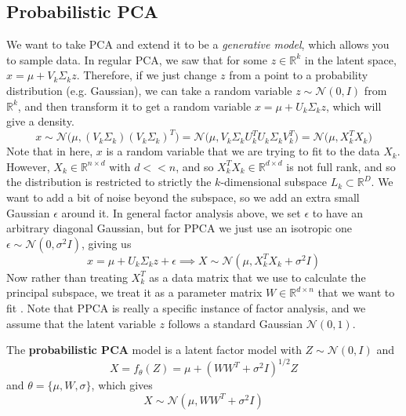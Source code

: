 \documentclass{article}
\begin{document}
\subsection{Probabilistic PCA}

  We want to take PCA and extend it to be a \textit{generative model}, which allows you to sample data. In regular PCA, we saw that for some $z \in \mathbb{R}^k$ in the latent space, $\hat{x} = \mu + V_k \Sigma_k z$. Therefore, if we just change $z$ from a point to a probability distribution (e.g. Gaussian), we can take a random variable $z \sim \mathcal{N}(0, I)$ from $\mathbb{R}^k$, and then transform it to get a random variable $x = \mu + U_k \Sigma_k z$, which will give a density. 
  \begin{equation}
    x \sim \mathcal{N} \big( \mu, (V_k \Sigma_k)(V_k \Sigma_k)^T \big) = \mathcal{N} \big( \mu, V_k \Sigma_k U_k^T U_k \Sigma_k V_k^T \big) = \mathcal{N} \big( \mu, X_k^T X_k)
  \end{equation} 
  Note that in here, $x$ is a random variable that we are trying to fit to the data $X_k$. However, $X_k \in \mathbb{R}^{n \times d}$ with $d << n$, and so $X_k^T X_k \in \mathbb{R}^{d \times d}$ is not full rank, and so the distribution is restricted to strictly the $k$-dimensional subspace $L_k \subset \mathbb{R}^D$. We want to add a bit of noise beyond the subspace, so we add an extra small Gaussian $\epsilon$ around it. In general factor analysis above, we set $\epsilon$ to have an arbitrary diagonal Gaussian, but for PPCA we just use an isotropic one $\epsilon \sim \mathcal{N}(0, \sigma^2 I)$, giving us  
  \begin{equation}
    x = \mu + U_k \Sigma_k z + \epsilon \implies X \sim \mathcal{N}(\mu, X_k^T X_k + \sigma^2 I)
  \end{equation} 
  Now rather than treating $X_k^T$ as a data matrix that we use to calculate the principal subspace, we treat it as a parameter matrix $W \in \mathbb{R}^{d \times n}$ that we want to fit \cite{ppca}. Note that PPCA is really a specific instance of factor analysis, and we assume that the latent variable $z$ follows a standard Gaussian $\mathcal{N}(0, 1)$. 

  \begin{definition} 
    The \textbf{probabilistic PCA} model is a latent factor model with $Z \sim \mathcal{N}(0, I)$ and 
    \begin{equation}
      X = f_\theta (Z) = \mu + (WW^T + \sigma^2 I )^{1/2} Z
    \end{equation}
    and $\theta = \{\mu, W, \sigma\}$, which gives
    \begin{equation}
      X \sim \mathcal{N}(\mu, W W^T + \sigma^2 I) 
    \end{equation} 
  \end{definition} 
\end{document}
